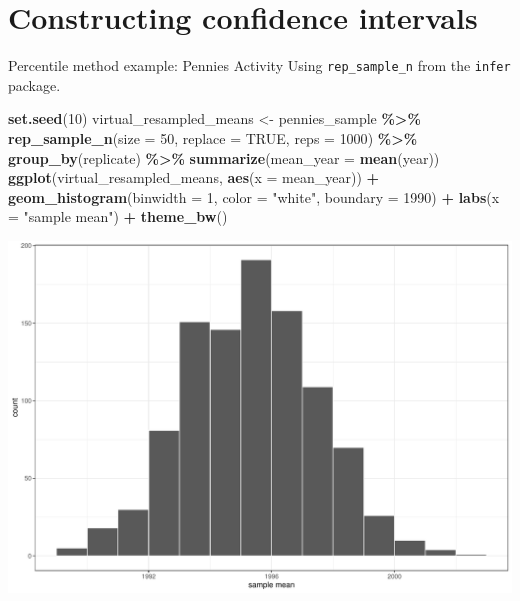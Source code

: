 \documentclass[
  ignorenonframetext,
]{beamer}
\newenvironment{Shaded}{\begin{snugshade}}{\end{snugshade}}
\newcommand{\AttributeTok}[1]{\textcolor[rgb]{0.13,0.29,0.53}{#1}}
\newcommand{\ConstantTok}[1]{\textcolor[rgb]{0.56,0.35,0.01}{#1}}
\newcommand{\DecValTok}[1]{\textcolor[rgb]{0.00,0.00,0.81}{#1}}
\newcommand{\FunctionTok}[1]{\textcolor[rgb]{0.13,0.29,0.53}{\textbf{#1}}}
\newcommand{\NormalTok}[1]{#1}
\newcommand{\OtherTok}[1]{\textcolor[rgb]{0.56,0.35,0.01}{#1}}
\newcommand{\SpecialCharTok}[1]{\textcolor[rgb]{0.81,0.36,0.00}{\textbf{#1}}}
\newcommand{\StringTok}[1]{\textcolor[rgb]{0.31,0.60,0.02}{#1}}
\begin{document}
\hypertarget{constructing-confidence-intervals}{%
\section{Constructing confidence
intervals}\label{constructing-confidence-intervals}}

\begin{frame}[fragile]{Percentile method example: Pennies Activity}
\protect\hypertarget{percentile-method-example-pennies-activity}{}
Using \texttt{rep\_sample\_n} from the \texttt{infer} package.

\tiny

\begin{Shaded}
\begin{Highlighting}[]
\FunctionTok{set.seed}\NormalTok{(}\DecValTok{10}\NormalTok{)}
\NormalTok{virtual\_resampled\_means }\OtherTok{\textless{}{-}}\NormalTok{ pennies\_sample }\SpecialCharTok{\%\textgreater{}\%} 
  \FunctionTok{rep\_sample\_n}\NormalTok{(}\AttributeTok{size =} \DecValTok{50}\NormalTok{, }\AttributeTok{replace =} \ConstantTok{TRUE}\NormalTok{, }\AttributeTok{reps =} \DecValTok{1000}\NormalTok{) }\SpecialCharTok{\%\textgreater{}\%} 
  \FunctionTok{group\_by}\NormalTok{(replicate) }\SpecialCharTok{\%\textgreater{}\%} 
  \FunctionTok{summarize}\NormalTok{(}\AttributeTok{mean\_year =} \FunctionTok{mean}\NormalTok{(year))}
\FunctionTok{ggplot}\NormalTok{(virtual\_resampled\_means, }\FunctionTok{aes}\NormalTok{(}\AttributeTok{x =}\NormalTok{ mean\_year)) }\SpecialCharTok{+}
  \FunctionTok{geom\_histogram}\NormalTok{(}\AttributeTok{binwidth =} \DecValTok{1}\NormalTok{, }\AttributeTok{color =} \StringTok{"white"}\NormalTok{, }\AttributeTok{boundary =} \DecValTok{1990}\NormalTok{) }\SpecialCharTok{+}
  \FunctionTok{labs}\NormalTok{(}\AttributeTok{x =} \StringTok{"sample mean"}\NormalTok{) }\SpecialCharTok{+}
  \FunctionTok{theme\_bw}\NormalTok{()}
\end{Highlighting}
\end{Shaded}

\begin{center}\includegraphics[width=0.6\linewidth,height=0.4\textheight]{Week10_Lect_files/figure-beamer/unnamed-chunk-14-1} \end{center}
\normalsize
\end{frame}
\end{document}
